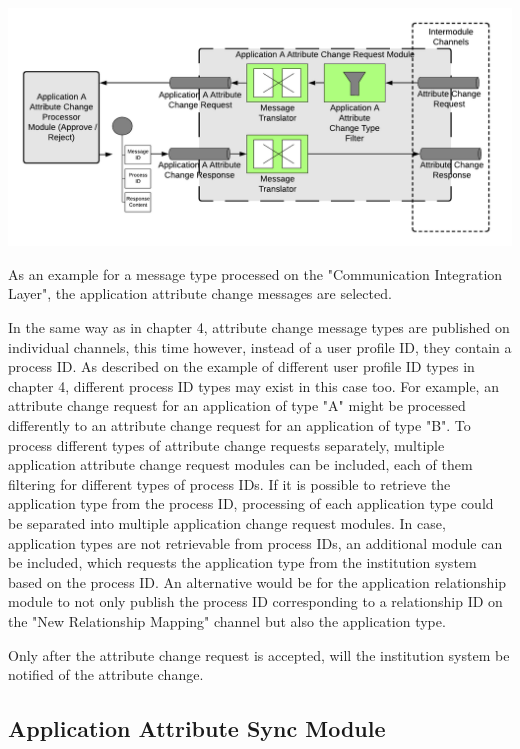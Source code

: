 \begin{center}
    \includegraphics[scale=0.5]{Diagrams/Integration Architecture 2/Technological Integration/7. Application Attribute Change Request Module.pdf}
\end{center}

As an example for a message type processed on the "Communication Integration Layer", the application attribute change messages are selected.

In the same way as in chapter 4, attribute change message types are published on individual channels, this time however, instead of a user profile ID, they contain a process ID. As described on the example of different user profile ID types in chapter 4, different process ID types may exist in this case too. For example, an attribute change request for an application of type "A" might be processed differently to an attribute change request for an application of type "B". To process different types of attribute change requests separately, multiple application attribute change request modules can be included, each of them filtering for different types of process IDs. If it is possible to retrieve the application type from the process ID, processing of each application type could be separated into multiple application change request modules. In case, application types are not retrievable from process IDs, an additional module can be included, which requests the application type from the institution system based on the process ID. An alternative would be for the application relationship module to not only publish the process ID corresponding to a relationship ID on the "New Relationship Mapping" channel but also the application type.

Only after the attribute change request is accepted, will the institution system be notified of the attribute change.

\subsection{Application Attribute Sync Module}

